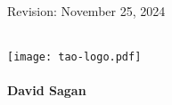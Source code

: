 \thispagestyle{empty}

\begin{flushright}
\large
Revision: November 25, 2024 \\
\end{flushright}

\vfill

{
\begin{center}
 \\
\vskip 0.2in
\texttt{[image: tao-logo.pdf]} \\
\vskip 0.3in
 \\
\vskip 0.4in
{\huge \sf\bf David Sagan} \\
\end{center}
}

\vfill
\break
